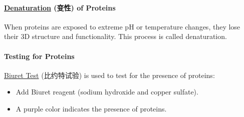 \paragraph{\underline{Denaturation} (变性) of Proteins}
When proteins are exposed to extreme pH or temperature changes, they lose their 3D structure and functionality. This process is
called denaturation.

\paragraph{Testing for Proteins}
\underline{Biuret Test} (比约特试验) is used to test for the presence of proteins:
\begin{itemize}
    \item Add Biuret reagent (sodium hydroxide and copper sulfate).
    \item A purple color indicates the presence of proteins.
\end{itemize}